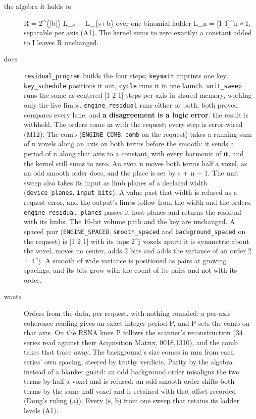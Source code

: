 \begin{description}
\item[{the algebra it holds to}] R = 2\textasciicircum{}\{|b|\} L\_\allowbreak{}s − L\_\allowbreak{}\{s+b\} over one binomial ladder L\_\allowbreak{}n = [1 1]\textasciicircum{}n ∗ I, separable per axis (A1). The kernel sums to zero exactly: a constant added to I leaves R unchanged.
\item[{does}] \texttt{residual\_\allowbreak{}program} builds the four steps; \texttt{keymath} imprints one key, \texttt{key\_\allowbreak{}schedule} positions it out, \texttt{cycle} runs it in one launch. \texttt{unit\_\allowbreak{}sweep} runs the same as centered [1 2 1] steps per axis in shared memory, working only the live limbs. \texttt{engine\_\allowbreak{}residual} runs either or both; both proved compares every lane, and \textbf{a disagreement is a logic error}: the result is withheld. The orders come in with the request; every step is error-wired (M12). The comb (\texttt{ENGINE\_\allowbreak{}COMB}, \texttt{comb} on the request) takes a running sum of n voxels along an axis on both terms before the smooth: it sends a period of n along that axis to a constant, with every harmonic of it, and the kernel still sums to zero. An even n moves both terms half a voxel, as an odd smooth order does, and the place is set by s + n − 1. The unit sweep also takes its input as limb planes of a declared width (\texttt{device\_\allowbreak{}planes}, \texttt{input\_\allowbreak{}bits}). A value past that width is refused as a request error, and the output's limbs follow from the width and the orders. \texttt{engine\_\allowbreak{}residual\_\allowbreak{}planes} passes it host planes and returns the residual with its limbs. The 16-bit volume path and the key are unchanged. A spaced pair (\texttt{ENGINE\_\allowbreak{}SPACED}, \texttt{smooth\_\allowbreak{}spaced} and \texttt{background\_\allowbreak{}spaced} on the request) is [1 2 1] with its taps 2\textasciicircum{}j voxels apart: it is symmetric about the voxel, moves no center, adds 2 bits and adds the variance of an order 2 · 4\textasciicircum{}j. A smooth of wide variance is positioned as pairs at growing spacings, and its bits grow with the count of its pairs and not with its order.
\item[{wants}] Orders from the data, per request, with nothing rounded: a per-axis coherence reading gives an exact integer period P, and P sets the comb on that axis. On the RSNA knee P follows the scanner's reconstruction (34 series read against their Acquisition Matrix, 0018,1310), and the comb takes that trace away. The background's size comes in mm from each series' own spacing, steered by truthy verdicts. Parity by the algebra instead of a blanket guard: an odd background order misaligns the two terms by half a voxel and is refused; an odd smooth order shifts both terms by the same half voxel and is retained with that offset recorded (Doug's ruling (a)). Every (s, b) from one sweep that retains its ladder levels (A1).

\end{description}

